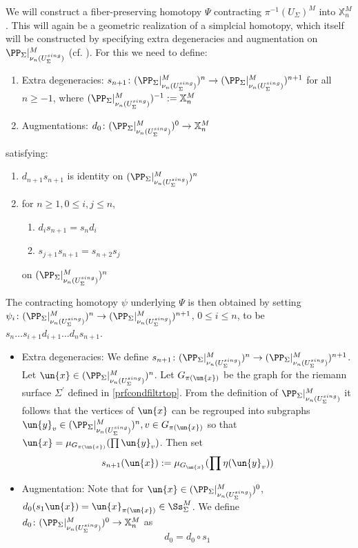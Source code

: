 \documentclass[a4paper,10pt]{amsart}
\begin{document}
We will construct a fiber-preserving homotopy $\Psi$ contracting $\pi^{-1}(U_{\Sigma})^M$ into $\mathbb{X}^M_n$. This will again be a geometric realization of a simplcial homotopy, which itself will be constructed by specifying extra degeneracies and augmentation on $\PP_{\Sigma}|_{\nu_n(U_{\Sigma}^{sing})}^M$ (cf. \cite[Section 6]{meyer1984bar}). For this we need to define:
	\begin{enumerate}
	 \item Extra degeneracies: $s_{n+1} \colon (\PP_{\Sigma}|_{\nu_n(U_{\Sigma}^{sing})}^M)^n \to (\PP_{\Sigma}|_{\nu_n(U_{\Sigma}^{sing})}^M)^{n+1}$ for all $n \geq -1$, where $(\PP_{\Sigma}|_{\nu_n(U_{\Sigma}^{sing})}^M)^{-1} := \mathbb{X}^M_n$
	 \item Augmentations: $d_0 \colon (\PP_{\Sigma}|_{\nu_n(U_{\Sigma}^{sing})}^M)^0 \to \mathbb{X}^M_n$
	\end{enumerate}
satisfying:
	\begin{enumerate}
		\item $d_{n+1}s_{n+1}$ is identity on $(\PP_{\Sigma}|_{\nu_n(U_{\Sigma}^{sing})}^M)^n$
		\item for $n \geq 1, 0 \leq i,j \leq n$, 
			\begin{enumerate}
			\item $d_{i}s_{n+1} = s_{n}d_i$
			\item $s_{j+1}s_{n+1} = s_{n+2}s_j$
			\end{enumerate}
		on $(\PP_{\Sigma}|_{\nu_n(U_{\Sigma}^{sing})}^M)^n$
	\end{enumerate}
	The contracting homotopy $\psi$ underlying $\Psi$ is then obtained by setting $\psi_i \colon (\PP_{\Sigma}|_{\nu_n(U_{\Sigma}^{sing})}^M)^n \to (\PP_{\Sigma}|_{\nu_n(U_{\Sigma}^{sing})}^M)^{n+1}$, $0 \leq i \leq n$, to be $s_n \hdots s_{i+1}d_{i+1} \hdots d_n s_{n+1}$.
	
	\begin{itemize}\label{extradegpsi}
	\item Extra degeneracies: We define $s_{n+1} \colon (\PP_{\Sigma}|_{\nu_n(U_{\Sigma}^{sing})}^M)^n \to (\PP_{\Sigma}|_{\nu_n(U_{\Sigma}^{sing})}^M)^{n+1}$. Let $\un{x} \in (\PP_{\Sigma}|_{\nu_n(U_{\Sigma}^{sing})}^M)^n$. Let $G_{\pi(\un{x})}$ be the graph for the riemann surface $\Sigma^\prime$ defined in \ref{prfcondfiltrtop}. From the definition of $\PP_{\Sigma}|_{\nu_n(U_{\Sigma}^{sing})}^M$ it follows that the vertices of $\un{x}$ can be regrouped into subgraphs $\un{y}_v \in  (\PP_{\Sigma}|_{\nu_n(U_{\Sigma}^{sing})}^M)^n , v\in G_{\pi(\un{x})}$ so that 
$\un{x} = \mu_{G_{\pi(\un{x})}} ( \prod \un{y}_v)$.
	Then  set 
	\[ s_{n+1}(\un{x}) := \mu_{G_{\un{x}}} ( \prod \eta(\un{y}_v)) \]
	\item Augmentation: Note that for $\un{x} \in  (\PP_{\Sigma}|_{\nu_n(U_{\Sigma}^{sing})}^M)^0 $, $d_0(s_1\un{x}) = \un{x}_{\pi(\un{x})} \in \Ss^M_{\Sigma}$. We define $d_0 \colon (\PP_{\Sigma}|_{\nu_n(U_{\Sigma}^{sing})}^M)^0 \to \mathbb{X}^M_n$ as
	\[ d_0 = d_0 \circ s_1 \]
	\end{itemize} 
\end{document}
